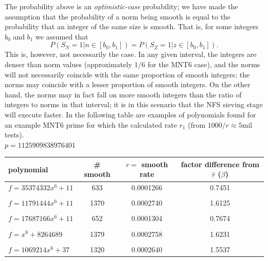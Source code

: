 \documentclass[a4paper, 10pt, envcountsect, runningheads]{lms}
\numberwithin{figure}{section}
\numberwithin{equation}{section}
\begin{document}
The probability above is an {\em optimistic-case} probability; we have made the assumption that the probability of a norm being smooth is equal to the probability that an integer of the same size is smooth. That is, for some integers $b_0$ and $b_1$ we assumed that $$P(S_N=1| n\in[b_0,b_1])=P(S_Z=1| z\in[b_0,b_1]).$$ This is, however, not necessarily the case. In any given interval, the integers are denser than norm values (approximately $1/6$ for the MNT6 case), and the norms will not necessarily coincide with the same proportion of smooth integers; the norms may coincide with a lesser proportion of smooth integers. On the other hand, the norms may in fact fall on more smooth integers than the ratio of integers to norms in that interval; it is in this scenario that the NFS sieving stage will execute faster. In the following table are examples of polynomials found for an example MNT6 prime for which the calculated rate $r_1$ (from $1000/\hat{r}\approx5$mil tests).\\
\newpage
$p=1125909838976401$
\begin{center}
\begin{tabular}{l|ccc}
polynomial & \# smooth & $r=$ smooth rate & factor difference from $\hat{r}$ ($\beta$)\\
\hline
$f=35374332x^6+11$ &633&0.0001266&0.7451\\
&&&\\
$f=11791444x^6+11$ &1370&0.0002740&1.6125\\
&&&\\
$f=17687166x^6+11$ &652&0.0001304&0.7674\\
&&&\\
$f=x^6+8264689$ &1379&0.0002758&1.6231\\
&&&\\
$f=1069214x^6+37$ &1320&0.0002640&1.5537
\end{tabular}
\end{center}
\vspace{0.5cm}
\end{document}
